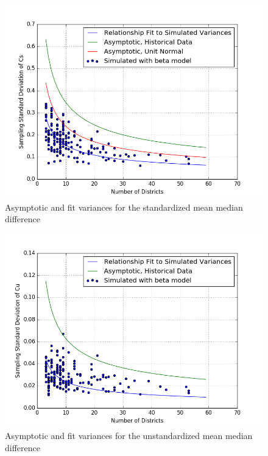 \documentclass[preprint,12pt]{article}
\begin{document}
\begin{figure}[htb!]
    \begin{center}
        \includegraphics[scale=0.8]{../Figures/SimVsAsymptotic/stdv_nCs.png}
        \caption{Asymptotic and fit variances for the standardized mean median difference}\label{fig:sCs}
    \end{center}
\end{figure}

\begin{figure}[htb!]
    \begin{center}
        \includegraphics[scale=0.8]{../Figures/SimVsAsymptotic/stdv_nCu.png}
        \caption{Asymptotic and fit variances for the unstandardized mean median difference}\label{fig:sCu}
    \end{center}
\end{figure}
\end{document}
